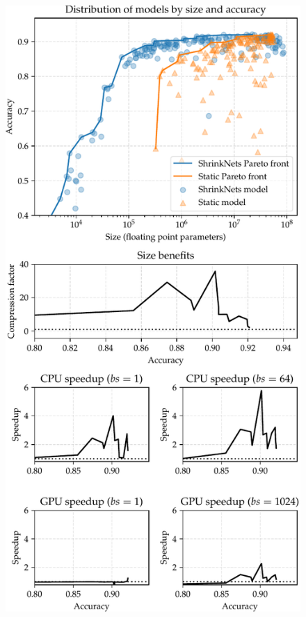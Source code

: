 \begin{figure}[t]\centering
\begin{minipage}{2.7in}
\begin{center}
\includegraphics[width=\columnwidth]{CIFAR10_VGG_summary}

\end{center}
\end{minipage}
\end{figure}
